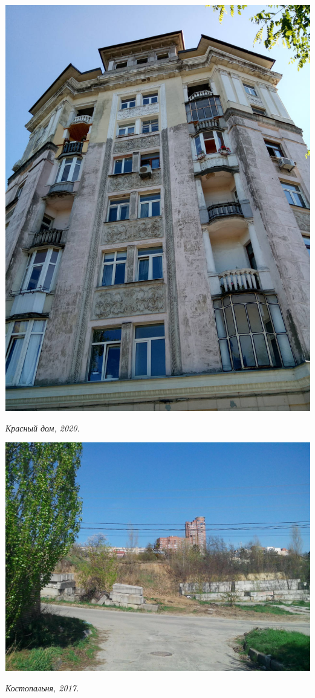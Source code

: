 \newpage


\vspace*{\fill}

\begin{center}
\includegraphics[width=\linewidth]{rpix/IMG_20200815_143315.jpg}

\textit{Красный дом, 2020.}
\end{center}


\vspace*{\fill}

\newpage

\begin{center}
\includegraphics[width=\linewidth]{rpix/IMG_20170411_145319.jpg}

\textit{Костопальня, 2017.}
\end{center}


